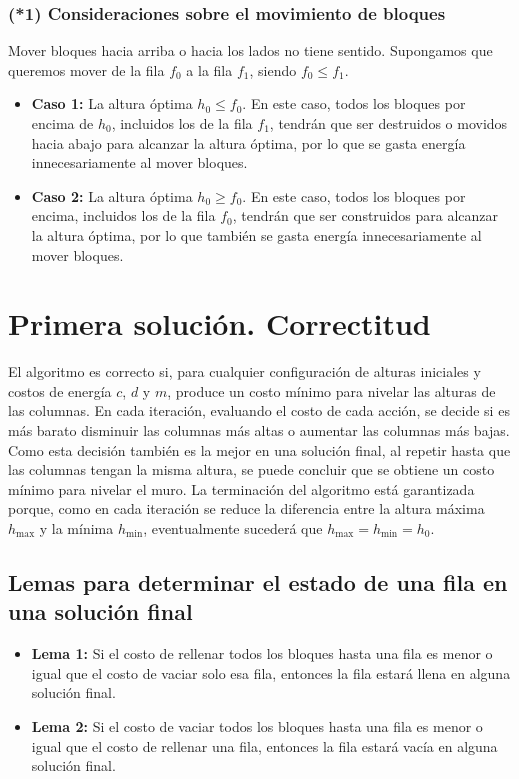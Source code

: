 \documentclass[a4paper,12pt]{article}
\begin{document}
\subsubsection*{(*1) Consideraciones sobre el movimiento de bloques}

Mover bloques hacia arriba o hacia los lados no tiene sentido. Supongamos que queremos mover de la fila $f_0$ a la fila $f_1$, siendo $f_0 \leq f_1$.

\begin{itemize}
	\item \textbf{Caso 1:} La altura óptima $h_0 \leq f_0$. En este caso, todos los bloques por encima de $h_0$, incluidos los de la fila $f_1$, tendrán que ser destruidos o movidos hacia abajo para alcanzar la altura óptima, por lo que se gasta energía innecesariamente al mover bloques.
	\item \textbf{Caso 2:} La altura óptima $h_0 \geq f_0$. En este caso, todos los bloques por encima, incluidos los de la fila $f_0$, tendrán que ser construidos para alcanzar la altura óptima, por lo que también se gasta energía innecesariamente al mover bloques.
\end{itemize}

\section{Primera solución. Correctitud}

El algoritmo es correcto si, para cualquier configuración de alturas iniciales y costos de energía $c$, $d$ y $m$, produce un costo mínimo para nivelar las alturas de las columnas. En cada iteración, evaluando el costo de cada acción, se decide si es más barato disminuir las columnas más altas o aumentar las columnas más bajas. Como esta decisión también es la mejor en una solución final, al repetir hasta que las columnas tengan la misma altura, se puede concluir que se obtiene un costo mínimo para nivelar el muro. La terminación del algoritmo está garantizada porque, como en cada iteración se reduce la diferencia entre la altura máxima $h_{\text{max}}$ y la mínima $h_{\text{min}}$, eventualmente sucederá que $h_{\text{max}} = h_{\text{min}} = h_0$.

\subsection{Lemas para determinar el estado de una fila en una solución final}

\begin{itemize}
	\item \textbf{Lema 1:} Si el costo de rellenar todos los bloques hasta una fila es menor o igual que el costo de vaciar solo esa fila, entonces la fila estará llena en alguna solución final.
	\item \textbf{Lema 2:} Si el costo de vaciar todos los bloques hasta una fila es menor o igual que el costo de rellenar una fila, entonces la fila estará vacía en alguna solución final.
\end{itemize}
\end{document}
